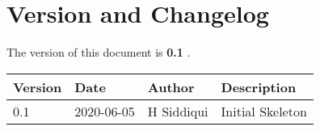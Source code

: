 \section{Version and Changelog}

The version of this document is {\bf 0.1} .

\begin{table}[H]
    \begin{tabular}{|l|l|l|p{10cm}| }
    \hline
    {\bf Version} & {\bf Date} & {\bf Author} & {\bf Description} \\ \hline
    0.1 & 2020-06-05 & H Siddiqui & Initial Skeleton\\ \hline
    \end{tabular}
\end{table}
